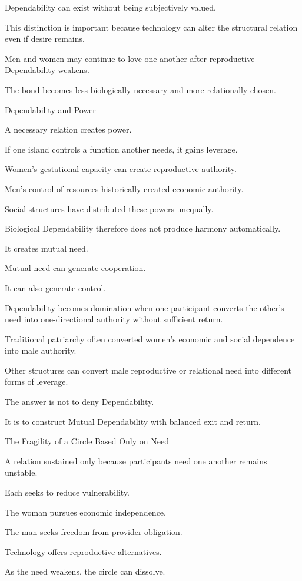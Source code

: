 Dependability can exist without being subjectively valued.

This distinction is important because technology can alter the structural relation even if desire remains.

Men and women may continue to love one another after reproductive Dependability weakens.

The bond becomes less biologically necessary and more relationally chosen.

Dependability and Power

A necessary relation creates power.

If one island controls a function another needs, it gains leverage.

Women’s gestational capacity can create reproductive authority.

Men’s control of resources historically created economic authority.

Social structures have distributed these powers unequally.

Biological Dependability therefore does not produce harmony automatically.

It creates mutual need.

Mutual need can generate cooperation.

It can also generate control.

Dependability becomes domination when one participant converts the other’s need into one-directional authority without sufficient return.

Traditional patriarchy often converted women’s economic and social dependence into male authority.

Other structures can convert male reproductive or relational need into different forms of leverage.

The answer is not to deny Dependability.

It is to construct Mutual Dependability with balanced exit and return.

The Fragility of a Circle Based Only on Need

A relation sustained only because participants need one another remains unstable.

Each seeks to reduce vulnerability.

The woman pursues economic independence.

The man seeks freedom from provider obligation.

Technology offers reproductive alternatives.

As the need weakens, the circle can dissolve.

